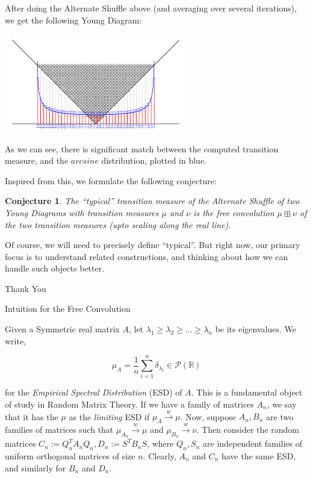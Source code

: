 \documentclass[aspectratio=169]{beamer}
\newcommand{\act}[1]{%
    \begin{frame}
    \centering
    \Huge

    {\color{purple} #1}
    \end{frame}
}
\newtheorem{conj}[theorem]{Conjecture}
\newcommand{\R}{\mathbb{R}}
\begin{document}
\begin{frame}

After doing the Alternate Shuffle above (and averaging over several iterations), we get the following Young Diagram: \pause
\begin{center}
    \includegraphics[width=0.6\textwidth]{shuffle}
\end{center}
\pause
As we can see, there is significant match between the computed transition measure, and the $arcsine$ distribution, plotted in {\color{blue} blue}.

\end{frame}

\begin{frame}
    Inspired from this, we formulate the following conjecture:



\begin{conj}
    The ``typical'' transition measure of the Alternate Shuffle of two Young Diagrams with transition measures $\mu$ and $\nu$ is the free convolution $\mu \boxplus \nu$ of the two transition measures (upto scaling along the real line).
\end{conj}
\pause Of course, we will need to precisely define ``typical''. But right now, our primary focus is to understand related constructions, and thinking about how we can handle such objects better.
\end{frame}

\act{Thank You}
\act{Intuition for the Free Convolution}

\newcommand{\weak}{\stackrel{w}{\longrightarrow}}

\begin{frame}
    Given a Symmetric real matrix $A$, let $\lambda_1 \geq \lambda_2 \geq \ldots \geq \lambda_n$ be its eigenvalues. \pause We write,

    \[ \mu_A = \frac{1}{n}\sum_{i = 1}^{n} \delta_{\lambda_i} \in \mathcal{P}(\R)\]

    for the \emph{Empirical Spectral Distribution} (ESD) of $A$. This is a fundamental object of study in Random Matrix Theory. \pause If we have a family of matrices $A_n$, we say that it has the $\mu$ as the \emph{limiting} ESD if $\mu_A \weak \mu$. \vskip 10pt \pause
    Now, suppose $A_n, B_n$ are two families of matrices such that $\mu_{A_n} \weak \mu$ and $\mu_{B_n} \weak \nu$. \pause Then consider the random matrices $C_n := Q^T_nA_nQ_n, D_n := S^TB_nS$, where $Q_n, S_n$ are independent families of uniform orthogonal matrices of size $n$. \pause Clearly, $A_n$ and $C_n$ have the same ESD, and similarly for $B_n$ and $D_n$. 
\end{frame}
\end{document}
